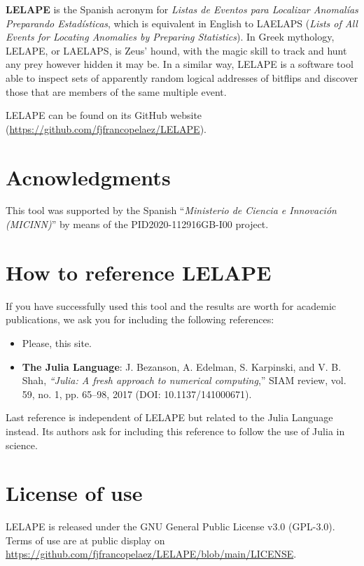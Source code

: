 \textbf{LELAPE} is the Spanish acronym for \textit{Listas de Eventos para Localizar Anomalías Preparando Estadísticas}, which is equivalent in English to LAELAPS (\textit{Lists of All Events for Locating Anomalies by Preparing Statistics}). In Greek mythology, LELAPE, or LAELAPS, is Zeus' hound, with the magic skill to track and hunt any prey however hidden it may be. In a similar way, LELAPE is a software tool able to inspect sets of apparently random logical addresses of bitflips and discover those that are members of the same multiple event.

LELAPE can be found on its GitHub website (\href{https://github.com/fjfrancopelaez/LELAPE}{https://github.com/fjfrancopelaez/LELAPE}).

\section{Acnowledgments}
%
This tool was supported by the Spanish ``\textit{Ministerio de Ciencia e Innovación (MICINN)}'' by means of the PID2020-112916GB-I00 project.
\section{How to reference LELAPE}
%
If you have successfully used this tool and the results are worth for academic publications, we ask you for including the following references:
%
\begin{itemize}
	\item Please, this site.
	\item \textbf{The Julia Language}: J. Bezanson, A. Edelman, S. Karpinski, and V. B. Shah, \textit{“Julia: A fresh approach to numerical computing},” SIAM review, vol. 59, no. 1, pp. 65–98, 2017 (DOI: 10.1137/141000671).
\end{itemize}
%
Last reference is independent of LELAPE but related to the Julia Language instead. Its authors ask for including this reference to follow the use of Julia in science.
%
\section{License of use}
%
LELAPE is released under the GNU General Public License v3.0 (GPL-3.0). Terms of use are at public display on \href{https://github.com/fjfrancopelaez/LELAPE/blob/main/LICENSE}{https://github.com/fjfrancopelaez/LELAPE/blob/main/LICENSE}. 


